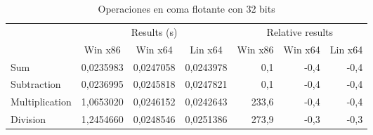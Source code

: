 \begin{table}[h]
\centering
\begin{tabular}{@{}l|rrr|rrr|@{}}
\cmidrule(l){2-7}
                                     & \multicolumn{3}{c|}{Results (s)}                                                               & \multicolumn{3}{c|}{Relative results}                                                      \\ \cmidrule(l){2-7} 
                                     & \multicolumn{1}{c|}{Win x86} & \multicolumn{1}{c|}{Win x64} & \multicolumn{1}{c|}{Lin x64} & \multicolumn{1}{c|}{Win x86} & \multicolumn{1}{c|}{Win x64} & \multicolumn{1}{c|}{Lin x64} \\ \midrule
\multicolumn{1}{|l|}{Sum}            & 0,0235983                    & 0,0247058                    & 0,0243978                    & 0,1                          & -0,4                         & -0,4                         \\ \cmidrule(r){1-1}
\multicolumn{1}{|l|}{Subtraction}    & 0,0236995                    & 0,0245818                    & 0,0247821                    & 0,1                          & -0,4                         & -0,4                         \\ \cmidrule(r){1-1}
\multicolumn{1}{|l|}{Multiplication} & 1,0653020                    & 0,0246152                    & 0,0242643                    & 233,6                        & -0,4                         & -0,4                         \\ \cmidrule(r){1-1}
\multicolumn{1}{|l|}{Division}       & 1,2454660                    & 0,0248546                    & 0,0251386                    & 273,9                        & -0,3                         & -0,3                         \\ \bottomrule
\end{tabular}
\caption{Operaciones en coma flotante con 32 bits}
\end{table}

